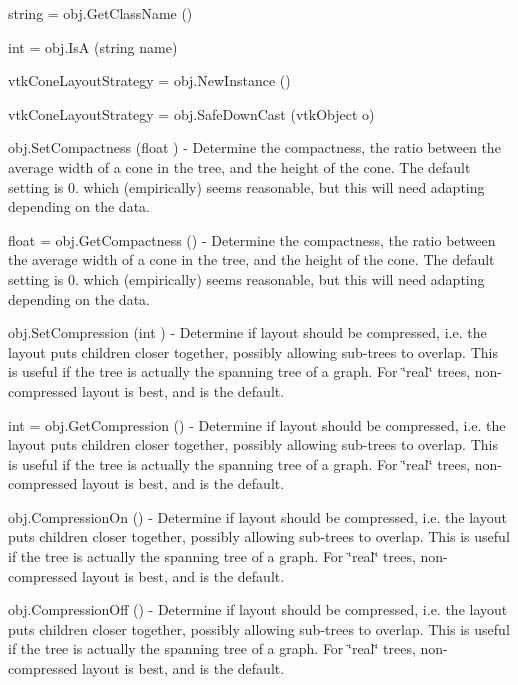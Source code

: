 \begin{DoxyItemize}
\item {\ttfamily string = obj.\-Get\-Class\-Name ()}  
\item {\ttfamily int = obj.\-Is\-A (string name)}  
\item {\ttfamily vtk\-Cone\-Layout\-Strategy = obj.\-New\-Instance ()}  
\item {\ttfamily vtk\-Cone\-Layout\-Strategy = obj.\-Safe\-Down\-Cast (vtk\-Object o)}  
\item {\ttfamily obj.\-Set\-Compactness (float )} -\/ Determine the compactness, the ratio between the average width of a cone in the tree, and the height of the cone. The default setting is 0. which (empirically) seems reasonable, but this will need adapting depending on the data.  
\item {\ttfamily float = obj.\-Get\-Compactness ()} -\/ Determine the compactness, the ratio between the average width of a cone in the tree, and the height of the cone. The default setting is 0. which (empirically) seems reasonable, but this will need adapting depending on the data.  
\item {\ttfamily obj.\-Set\-Compression (int )} -\/ Determine if layout should be compressed, i.\-e. the layout puts children closer together, possibly allowing sub-\/trees to overlap. This is useful if the tree is actually the spanning tree of a graph. For \char`\"{}real\char`\"{} trees, non-\/compressed layout is best, and is the default.  
\item {\ttfamily int = obj.\-Get\-Compression ()} -\/ Determine if layout should be compressed, i.\-e. the layout puts children closer together, possibly allowing sub-\/trees to overlap. This is useful if the tree is actually the spanning tree of a graph. For \char`\"{}real\char`\"{} trees, non-\/compressed layout is best, and is the default.  
\item {\ttfamily obj.\-Compression\-On ()} -\/ Determine if layout should be compressed, i.\-e. the layout puts children closer together, possibly allowing sub-\/trees to overlap. This is useful if the tree is actually the spanning tree of a graph. For \char`\"{}real\char`\"{} trees, non-\/compressed layout is best, and is the default.  
\item {\ttfamily obj.\-Compression\-Off ()} -\/ Determine if layout should be compressed, i.\-e. the layout puts children closer together, possibly allowing sub-\/trees to overlap. This is useful if the tree is actually the spanning tree of a graph. For \char`\"{}real\char`\"{} trees, non-\/compressed layout is best, and is the default.  

\end{DoxyItemize}
